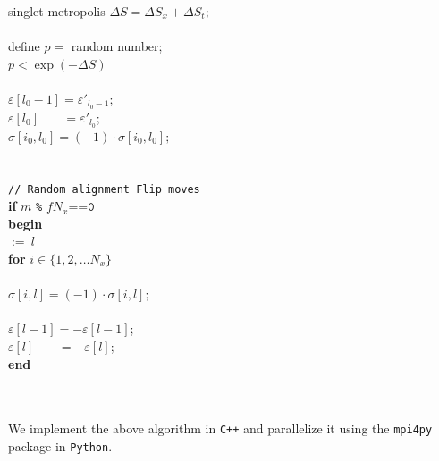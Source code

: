\documentclass[../thesis_main.tex]{subfiles}
\begin{document}
\begin{algorithm}{singlet-metropolis}
    \>\>\> $\Delta S = \Delta S_x + \Delta S_t ;$ \\ 
    \\
    \>\>\> define $p = $ random number; \\
    \>\> $p < \exp(-\Delta S)$\\  
    \>\>\\
    \>\>\>\> $\varepsilon[l_0 - 1] = \varepsilon'_{l_0-1}$; \\
    \>\>\>\> $\varepsilon[l_0] \:\:\:\:\quad =  \varepsilon'_{l_0}$; \\
    \>\>\>\> $\sigma[i_0, l_0] = (-1)\cdot \sigma[i_0, l_0];$\\
    \>\>\\
    \\
    \>\>\> \texttt{// Random alignment Flip moves} \\
    \>\>\> {\bf if} $m$ \texttt{\%} $f N_x \texttt{==0}$  \\
    \>\>\> {\bf begin} \\
    \>\>\>\>  $:= \: l$ \\
    \>\>\>\> {\bf for } $i \in \{1, 2, \ldots N_x\}$ \\
    \>\>\> \\
    \>\>\>\>\> $\sigma[i, l] = (-1)\cdot \sigma[i, l];$\\
    \>\>\>\\    
    \>\>\>\> $\varepsilon[l - 1] = - \varepsilon[l - 1]$; \\
    \>\>\>\> $\varepsilon[l] \:\:\:\:\quad =  - \varepsilon[l]$; \\
    \>\>\> {\bf end}\\

    \>\\
     \\
\end{algorithm}
We implement the above algorithm in \texttt{C++} and parallelize it using the \texttt{mpi4py} package in \texttt{Python}. 
\end{document}
